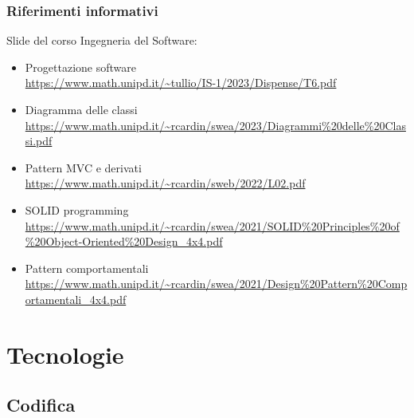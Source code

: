 \documentclass[5pt]{article}
\begin{document}
	\subsubsection{Riferimenti informativi}
	Slide del corso Ingegneria del Software:
	\begin{itemize}
		\item Progettazione software \\
		\url{https://www.math.unipd.it/~tullio/IS-1/2023/Dispense/T6.pdf}
		\item Diagramma delle classi \\
		\url{https://www.math.unipd.it/~rcardin/swea/2023/Diagrammi%20delle%20Classi.pdf}
		\item Pattern MVC e derivati \\
		\url{https://www.math.unipd.it/~rcardin/sweb/2022/L02.pdf}
		\item SOLID programming \\
		\url{https://www.math.unipd.it/~rcardin/swea/2021/SOLID%20Principles%20of%20Object-Oriented%20Design_4x4.pdf}
		\item Pattern comportamentali \\
		\url{https://www.math.unipd.it/~rcardin/swea/2021/Design%20Pattern%20Comportamentali_4x4.pdf}
	\end{itemize}
	
	\section{Tecnologie}
	
	\subsection{Codifica}
\end{document}
